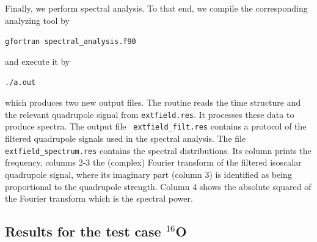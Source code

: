 \documentclass[A4]{elsarticle}
\begin{document}
Finally, we perform spectral analysis. To that end, we compile
the corresponding analyzing tool by\\
%
\centerline{\tt  gfortran spectral\_analysis.f90}
%
and execute it by\\
\centerline{\tt  ./a.out}
%
which produces two new output files. The routine reads the time
structure and the relevant quadrupole signal from {\tt extfield.res}.
It processes these data to produce spectra.  The output file {\tt
  extfield\_filt.res} contains a protocol of the filtered quadrupole
signals used in the spectral analysis. The file {\tt
  extfield\_spectrum.res} contains the spectral distributions. Its
column prints the frequency, columns 2-3 the (complex) Fourier
transform of the filtered isoscalar quadrupole signal, where its
imaginary part (column 3) is identified as being proportional to the
quadrupole strength. Column 4 shows the absolute squared of the
Fourier transform which is the spectral power.

\subsection{Results for the test case $^{16}$O}
\end{document}
